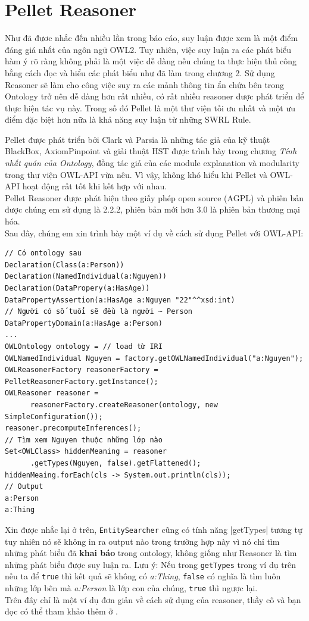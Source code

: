 \section{Pellet Reasoner}
Như đã đươc nhắc đến nhiều lần trong báo cáo, suy luận được xem là một điểm đáng giá nhất của ngôn ngữ OWL2. Tuy nhiên, việc suy luận ra các phát biểu hàm ý rõ ràng không phải là một việc dễ dàng nếu chúng ta thực hiện thủ công bằng cách đọc và hiểu các phát biểu như đã làm trong chương 2. Sử dụng Reasoner sẽ làm cho công việc suy ra các mảnh thông tin ẩn chứa bên trong Ontology trở nên dễ dàng hơn rất nhiều, có rất nhiều reasoner được phát triển để thực hiện tác vụ này. Trong số đó Pellet \cite{pellet} là một thư viện tối ưu nhất và  một ưu điểm đặc biệt hơn nữa là khả năng suy luận từ những SWRL Rule.

Pellet được phát triển bởi Clark và Parsia \cite{repair} \cite{axiomPinpoint} là những tác giả của kỹ thuật BlackBox, AxiomPinpoint và giải thuật HST được trình bày trong chương \textit{Tính nhất quán của Ontology}, đồng tác giả của các module explanation và modularity trong thư viện OWL-API vừa nêu. Vì vậy, không khó hiểu khi Pellet và OWL-API hoạt động rất tốt khi kết hợp với nhau.
\\
Pellet Reasoner được phát hiện theo giấy phép open source (AGPL) và phiên bản được chúng em sử dụng là 2.2.2, phiên bản mới hơn 3.0 là phiên bản thương mại hóa.
\\
Sau đây, chúng em xin trình bày một ví dụ về cách sử dụng Pellet với OWL-API:
\begin{verbatim}
// Có ontology sau
Declaration(Class(a:Person))
Declaration(NamedIndividual(a:Nguyen))
Declaration(DataPropery(a:HasAge))
DataPropertyAssertion(a:HasAge a:Nguyen "22"^^xsd:int)
// Người có số tuổi sẽ đều là người ~ Person
DataPropertyDomain(a:HasAge a:Person)
...
OWLOntology ontology = // load từ IRI 
OWLNamedIndividual Nguyen = factory.getOWLNamedIndividual("a:Nguyen"); 
OWLReasonerFactory reasonerFactory = PelletReasonerFactory.getInstance();
OWLReasoner reasoner = 
      reasonerFactory.createReasoner(ontology, new SimpleConfiguration());
reasoner.precomputeInferences();
// Tìm xem Nguyen thuộc những lớp nào
Set<OWLClass> hiddenMeaning = reasoner
      .getTypes(Nguyen, false).getFlattened();
hiddenMeaing.forEach(cls -> System.out.println(cls));
// Output
a:Person
a:Thing
\end{verbatim}
Xin được nhắc lại ở trên, \verb|EntitySearcher| cũng có tính năng |getTypes| tương tự tuy nhiên nó sẽ không in ra output nào trong trường hợp này vì nó chỉ tìm những phát biểu đã \textbf{khai báo} trong ontology, không giống như Reasoner là tìm những phát biểu được suy luận ra. Lưu ý: Nếu trong \verb|getTypes| trong ví dụ trên nếu ta để \verb|true| thì kết quả sẽ không có \textit{a:Thing}, \verb|false| có nghĩa là tìm luôn những lớp bên mà \textit{a:Person} là lớp con của chúng, \verb|true| thì ngược lại.
\\
Trên đây chỉ là một ví dụ đơn giản về cách sử dụng của reasoner, thầy cô và bạn đọc có thể tham khảo thêm ở \cite{pellet}.

